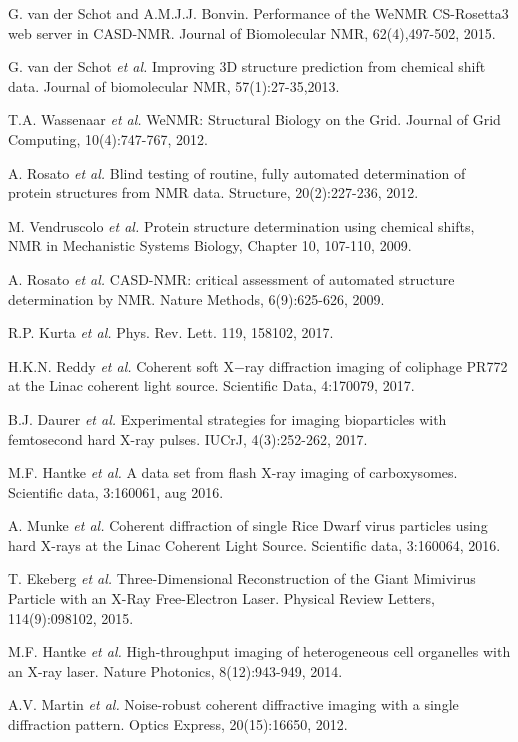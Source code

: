 \documentclass{UUThesisTemplate}
\begin{document}
    \begin{listofsupportingpapers}
	\item G. van der Schot and A.M.J.J. Bonvin. Performance of the WeNMR CS-Rosetta3 web server in CASD-NMR. Journal of Biomolecular NMR, 62(4),497-502, 2015.	
	\item G. van der Schot \textit{et al.} Improving 3D structure prediction from chemical shift data. Journal of biomolecular NMR, 57(1):27-35,2013.
	\item T.A. Wassenaar \textit{et al.} WeNMR: Structural Biology on the Grid. Journal of Grid Computing, 10(4):747-767, 2012.
	\item A. Rosato    \textit{et al.} Blind testing of routine, fully automated determination of protein structures from NMR data. Structure, 20(2):227-236, 2012.
	\item M. Vendruscolo \textit{et al.} Protein structure
determination using chemical shifts, NMR in Mechanistic Systems Biology, Chapter 10, 107-110, 2009.
 	\item A. Rosato    \textit{et al.} CASD-NMR: critical assessment of automated structure determination by NMR. Nature Methods, 6(9):625-626, 2009.
 	\item R.P. Kurta   \textit{et al.} Phys. Rev. Lett. 119, 158102, 2017.
	\item H.K.N. Reddy \textit{et al.} Coherent soft X$-$ray diffraction imaging of coliphage PR772 at the Linac coherent light source. Scientific Data, 4:170079, 2017.
	\item  B.J. Daurer \textit{et al.} Experimental strategies for imaging bioparticles with femtosecond hard X-ray pulses. IUCrJ, 4(3):252-262, 2017.
	\item M.F. Hantke  \textit{et al.} A data set from flash X-ray imaging of carboxysomes. Scientific data, 3:160061, aug 2016.
	\item A. Munke     \textit{et al.} Coherent diffraction of single Rice Dwarf virus particles using hard X-rays at the Linac Coherent Light Source. Scientific data, 3:160064, 2016.
	\item T. Ekeberg   \textit{et al.} Three-Dimensional Reconstruction of the Giant Mimivirus Particle with an X-Ray Free-Electron Laser. Physical Review Letters, 114(9):098102, 2015.
	\item M.F. Hantke  \textit{et al.} High-throughput imaging of heterogeneous cell organelles with an X-ray laser. Nature Photonics, 8(12):943-949, 2014.
	\item A.V. Martin  \textit{et al.} Noise-robust coherent diffractive imaging with a single diffraction pattern. Optics Express, 20(15):16650, 2012.	
    \end{listofsupportingpapers}
    \begingroup
        \tableofcontents
    \endgroup
    
\end{document}
